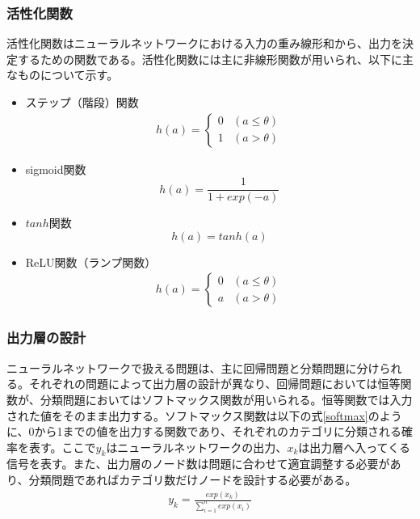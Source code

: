 \subsubsection{活性化関数}
活性化関数はニューラルネットワークにおける入力の重み線形和から、出力を決定するための関数である。活性化関数には主に非線形関数が用いられ、以下に主なものについて示す。
\begin{itemize}
	\item ステップ（階段）関数
		\begin{align}
			h(a) =
			\begin{cases}
			0 & (a \leq \theta)\\
			1 & (a > \theta)
			\end{cases}
		\end{align}
	\item sigmoid関数
		\begin{equation}
			h(a) = \frac{1}{1+exp(-a)}
		\end{equation}
	\item $tanh$関数
		\begin{equation}
			h(a) = tanh(a)
	\end{equation}
	\item ReLU関数（ランプ関数）
		\begin{align}
			h(a) =
			\begin{cases}
			0 & (a \leq \theta)\\
			a & (a > \theta)
			\end{cases}
		\end{align}
\end{itemize}

\subsubsection{出力層の設計}
ニューラルネットワークで扱える問題は、主に回帰問題と分類問題に分けられる。それぞれの問題によって出力層の設計が異なり、回帰問題においては恒等関数が、分類問題においてはソフトマックス関数が用いられる。恒等関数では入力された値をそのまま出力する。ソフトマックス関数は以下の式\ref{softmax}のように、0から1までの値を出力する関数であり、それぞれのカテゴリに分類される確率を表す。ここで$y_k$はニューラルネットワークの出力、$x_k$は出力層へ入ってくる信号を表す。また、出力層のノード数は問題に合わせて適宜調整する必要があり、分類問題であればカテゴリ数だけノードを設計する必要がある。
\begin{align}
y_k = \frac{exp(x_k)}{\sum_{i=1}^n exp(x_i)}
\end{align}

